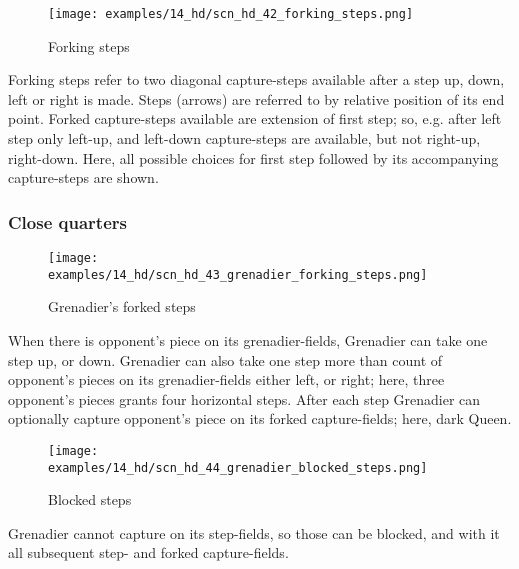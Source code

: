\vspace*{-0.7\baselineskip}
\noindent
\begin{wrapfigure}[11]{l}{0.4\textwidth}
\centering
\texttt{[image: examples/14\_hd/scn\_hd\_42\_forking\_steps.png]}
\vspace*{-0.5\baselineskip}
\caption{Forking steps}
\label{fig:scn_hd_42_forking_steps}
\end{wrapfigure}
Forking steps refer to two diagonal capture-steps available after a step up, down,
left or right is made. \newline
\indent
Steps (arrows) are referred to by relative position of its end point. \newline
\indent
Forked capture-steps available are extension of first step; so, e.g. after left
step only left-up, and left-down capture-steps are available, but not right-up,
right-down. \newline
\indent
Here, all possible choices for first step followed by its accompanying
capture-steps are shown.

\clearpage %

\subsubsection*{Close quarters}
\label{sec:Hemera's Dawn/Grenadier/Movement/Close quarters}

\vspace*{-1.5\baselineskip}
\noindent
\begin{figure}[!h]
\texttt{[image: examples/14\_hd/scn\_hd\_43\_grenadier\_forking\_steps.png]}
\vspace*{-1.4\baselineskip}
\caption{Grenadier's forked steps}
\label{fig:scn_hd_43_grenadier_forking_steps}
\end{figure}

\vspace*{-0.7\baselineskip}
When there is opponent's piece on its grenadier-fields, Grenadier can take one step
up, or down. Grenadier can also take one step more than count of opponent's pieces
on its grenadier-fields either left, or right; here, three opponent's pieces grants
four horizontal steps. After each step Grenadier can optionally capture opponent's
piece on its forked capture-fields; here, dark Queen.

\vspace*{-0.7\baselineskip}
\noindent
\begin{wrapfigure}[4]{l}{0.41\textwidth}
\centering
\texttt{[image: examples/14\_hd/scn\_hd\_44\_grenadier\_blocked\_steps.png]}
\vspace*{-0.5\baselineskip}
\caption{Blocked steps}
\label{fig:scn_hd_44_grenadier_blocked_steps}
\end{wrapfigure}
Grenadier cannot capture on its step-fields, so those can be blocked, and with it
all subsequent step- and forked capture-fields.

